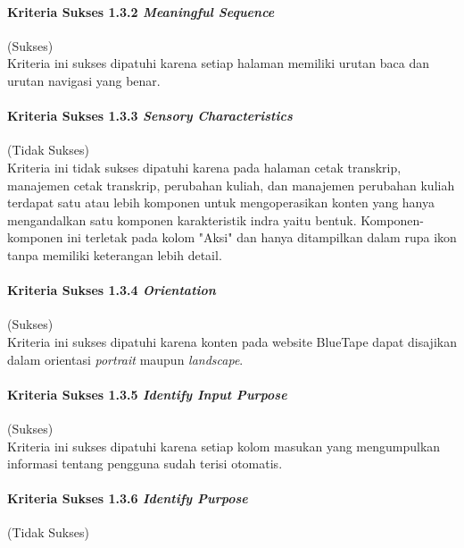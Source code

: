 \paragraph{Kriteria Sukses 1.3.2 \textit{Meaningful Sequence}}
\label{par:kepatuhan_bluetape_kriteria_sukses_1.3.2}
(Sukses)\\

Kriteria ini sukses dipatuhi karena setiap halaman memiliki urutan baca dan urutan navigasi yang benar. 

\paragraph{Kriteria Sukses 1.3.3 \textit{Sensory Characteristics}}
\label{par:kepatuhan_bluetape_kriteria_sukses_1.3.3}
(Tidak Sukses)\\

Kriteria ini tidak sukses dipatuhi karena pada halaman cetak transkrip, manajemen cetak transkrip, perubahan kuliah, dan manajemen perubahan kuliah terdapat satu atau lebih komponen untuk mengoperasikan konten yang hanya mengandalkan satu komponen karakteristik indra yaitu bentuk. Komponen-komponen ini terletak pada kolom "Aksi" dan hanya ditampilkan dalam rupa ikon tanpa memiliki keterangan lebih detail.

\paragraph{Kriteria Sukses 1.3.4 \textit{Orientation}}
\label{par:kepatuhan_bluetape_kriteria_sukses_1.3.4}
(Sukses)\\

Kriteria ini sukses dipatuhi karena konten pada website BlueTape dapat disajikan dalam orientasi \textit{portrait} maupun \textit{landscape}.

\paragraph{Kriteria Sukses 1.3.5 \textit{Identify Input Purpose}}
\label{par:kepatuhan_bluetape_kriteria_sukses_1.3.5}
(Sukses)\\

Kriteria ini sukses dipatuhi karena setiap kolom masukan yang mengumpulkan informasi tentang pengguna sudah terisi otomatis.

\paragraph{Kriteria Sukses 1.3.6 \textit{Identify Purpose}}
\label{par:kepatuhan_bluetape_kriteria_sukses_1.3.6}
(Tidak Sukses)\\

